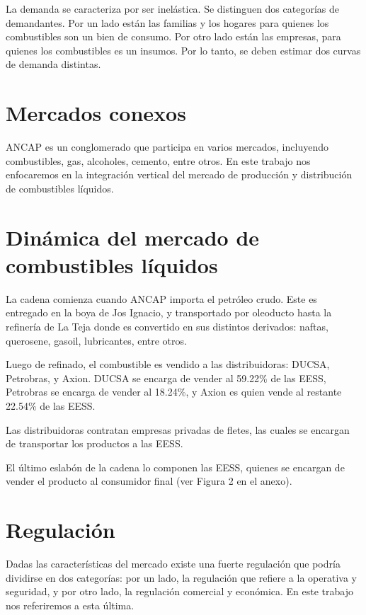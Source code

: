 \documentclass[spanish,A4,11pt]{article}
\begin{document}
La demanda se caracteriza por ser inelástica. Se distinguen dos categorías de demandantes. Por un lado están las familias y los hogares para quienes los combustibles son un bien de consumo. Por otro lado están las empresas, para quienes los combustibles es un insumos. Por lo tanto, se deben estimar dos curvas de demanda distintas.

\section{Mercados conexos}

ANCAP es un conglomerado que participa en varios mercados, incluyendo combustibles, gas, alcoholes, cemento, entre otros. En este trabajo nos enfocaremos en la integración vertical del mercado de producción y distribución de combustibles líquidos. 

\section{Dinámica del mercado de combustibles líquidos}

La cadena comienza cuando ANCAP importa el petróleo crudo. Este es entregado en la boya de Jos Ignacio, y transportado por oleoducto hasta la refinería de La Teja donde es convertido en sus distintos derivados: naftas, querosene, gasoil, lubricantes, entre otros.

Luego de refinado, el combustible es vendido a las distribuidoras: DUCSA, Petrobras, y Axion. DUCSA se encarga de vender al 59.22\% de las EESS, Petrobras se encarga de vender al 18.24\%, y Axion es quien vende al restante 22.54\% de las EESS.

Las distribuidoras contratan empresas privadas de fletes, las cuales se encargan de transportar los productos a las EESS.

El último eslabón de la cadena lo componen las EESS, quienes se encargan de vender el producto al consumidor final (ver Figura 2 en el anexo). 

\section{Regulación}

Dadas las características del mercado existe una fuerte regulación que podría dividirse en dos categorías: por un lado, la regulación que refiere a la operativa y seguridad, y por otro lado, la regulación comercial y económica. En este trabajo nos referiremos a esta última.
\end{document}
